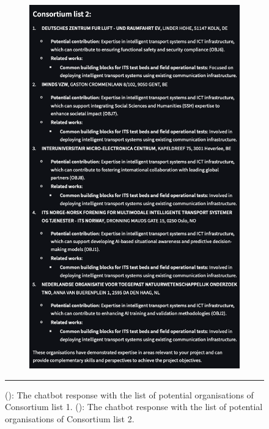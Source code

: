 \begin{figure}[h]
\begin{subfigure}{0.45\textwidth}
        \includegraphics[width=.8\textwidth]{figures/implementation/example-consortium-organisations-recommendation-answer-pt2.png}
        \caption{}
        \label{fig:example-consortium-organisations-recommendation-answer-pt2}
    \end{subfigure}
    \rule{35em}{0.5pt}
    \caption{(): The chatbot response with the list of potential organisations of Consortium list 1.
    (): The chatbot response with the list of potential organisations of Consortium list 2.}
    \label{fig:example-consortium-organisations-recommendation-answer}
\end{figure}